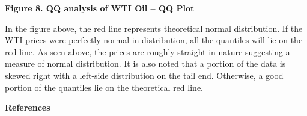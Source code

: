 \documentclass[12pt,twoside]{article}
\begin{document}

\begin{justify}
{\fontsize{11pt}{13.2pt}\selectfont \par}
\end{justify}\par

\begin{Center}
{\fontsize{11pt}{13.2pt}\selectfont \textbf{Figure 8. QQ analysis of WTI Oil – QQ Plot}\par}
\end{Center}\par


\vspace{\baselineskip}\begin{justify}
{\fontsize{11pt}{13.2pt}\selectfont In the figure above, the red line represents theoretical normal distribution. If the WTI prices were perfectly normal in distribution, all the quantiles will lie on the red line. As seen above, the prices are roughly straight in nature suggesting a measure of normal distribution. It is also noted that a portion of the data is skewed right with a left-side distribution on the tail end. Otherwise, a good portion of the quantiles lie on the theoretical red line.\par}
\end{justify}\par

\begin{justify}
{\fontsize{11pt}{13.2pt}\selectfont \par}
\end{justify}
\vspace{\baselineskip}
\vspace{\baselineskip}
\vspace{\baselineskip}
\vspace{\baselineskip}
\vspace{\baselineskip}\begin{justify}
{\fontsize{13pt}{15.6pt}\selectfont \textbf{References}\par}
\end{justify}\par
\end{document}
